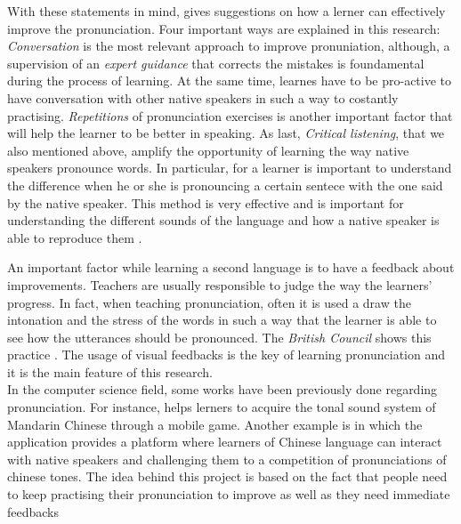 \noindent With these statements in mind, \cite{gilakjani2011pronunciation} gives suggestions on how a lerner can effectively improve the pronunciation. Four important ways are explained in this research: \textit{Conversation} is the most relevant approach to improve pronuniation, although, a supervision of an \textit{expert guidance} that corrects the mistakes is foundamental during the process of learning. At the same time, learnes have to be pro-active to have conversation with other native speakers in such a way to costantly practising. \textit{Repetitions} of pronunciation exercises is another important factor that will help the learner to be better in speaking. As last, \textit{Critical listening}, that we also mentioned above, amplify the opportunity of learning the way native speakers pronounce words. In particular, for a learner is important to understand the difference when he or she is pronouncing a certain sentece with the one said by the native speaker. This method is very effective and is important for understanding the different sounds of the language and how a native speaker is able to reproduce them \cite{rost2014listening}.

\noindent An important factor while learning a second language is to have a feedback about improvements. Teachers are usually responsible to judge the way the learners' progress. In fact, when teaching pronunciation, often it is used a draw the intonation and the stress of the words in such a way that the learner is able to see how the utterances should be pronounced. The \textit{British Council} shows this practice \cite{bbc_stress}. The usage of visual feedbacks is the key of learning pronunciation and it is the main feature of this research. \\

\noindent In the computer science field, some works have been previously done regarding pronunciation. For instance, \cite{edge2012tip} helps lerners to acquire the tonal sound system of Mandarin Chinese through a mobile game. Another example is \cite{head2014tonewars} in which the application provides a platform where learners of Chinese language can interact with native speakers and challenging them to a competition of pronunciations of chinese tones.
\noindent The idea behind this project is based on the fact that people need to keep practising their pronunciation to improve as well as they need immediate feedbacks
